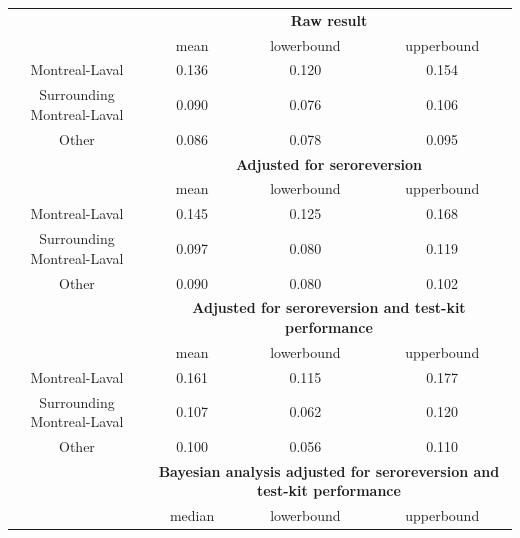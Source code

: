 \begin{table}[]
\centering
\label{tab:results}
\begin{tabular}{c|ccc}
                           & \multicolumn{3}{c}{\textbf{Raw result}}                                        \\
                           & mean                & lowerbound             & upperbound             \\
Montreal-Laval             & 0.136               & 0.120                  & 0.154                  \\
Surrounding Montreal-Laval & 0.090               & 0.076                  & 0.106                  \\
Other                      & 0.086               & 0.078                  & 0.095                  \\
\hline
                           & \multicolumn{3}{c}{\textbf{Adjusted for seroreversion}}                          \\
                           & mean                & lowerbound             & upperbound             \\
Montreal-Laval             & 0.145               & 0.125                  & 0.168                  \\
Surrounding Montreal-Laval & 0.097               & 0.080                  & 0.119                  \\
Other                      & 0.090               & 0.080                  & 0.102                  \\
\hline
                           & \multicolumn{3}{c}{\textbf{Adjusted for seroreversion and test-kit performance}} \\
                           & mean                & lowerbound             & upperbound             \\
Montreal-Laval             & 0.161               & 0.115                  & 0.177                  \\
Surrounding Montreal-Laval & 0.107               & 0.062                  & 0.120                  \\
Other                      & 0.100               & 0.056                  & 0.110                  \\
\hline
                           & \multicolumn{3}{c}{\textbf{Bayesian analysis adjusted for seroreversion and test-kit performance}}                                 \\
                           & median              & lowerbound             & upperbound             \\

\end{tabular}
\end{table}
